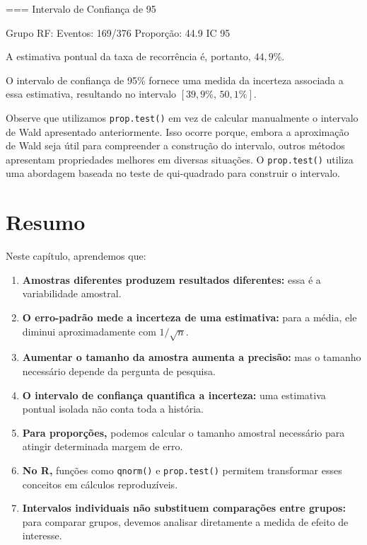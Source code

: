 \begin{code}[Resultado]
=== Intervalo de Confiança de 95%

Grupo RF:
  Eventos: 169/376
  Proporção: 44.9 %
  IC 95%
\end{code}

A estimativa pontual da taxa de recorrência é, portanto, $44{,}9\%$.

O intervalo de confiança de 95\% fornece uma medida da incerteza associada a essa estimativa, resultando no intervalo $[39{,}9\%,\,50{,}1\%]$.

Observe que utilizamos \texttt{prop.test()} em vez de calcular manualmente o intervalo de Wald apresentado anteriormente. Isso ocorre porque, embora a aproximação de Wald seja útil para compreender a construção do intervalo, outros métodos apresentam propriedades melhores em diversas situações. O \texttt{prop.test()} utiliza uma abordagem baseada no teste de qui-quadrado para construir o intervalo.

\section{Resumo}

Neste capítulo, aprendemos que:

\begin{enumerate}
    \item \textbf{Amostras diferentes produzem resultados diferentes:} essa é a variabilidade amostral.
    \item \textbf{O erro-padrão mede a incerteza de uma estimativa:} para a média, ele diminui aproximadamente com $1/\sqrt{n}$.
    \item \textbf{Aumentar o tamanho da amostra aumenta a precisão:} mas o tamanho necessário depende da pergunta de pesquisa.
    \item \textbf{O intervalo de confiança quantifica a incerteza:} uma estimativa pontual isolada não conta toda a história.
    \item \textbf{Para proporções,} podemos calcular o tamanho amostral necessário para atingir determinada margem de erro.
    \item \textbf{No R,} funções como \texttt{qnorm()} e \texttt{prop.test()} permitem transformar esses conceitos em cálculos reproduzíveis.
    \item \textbf{Intervalos individuais não substituem comparações entre grupos:} para comparar grupos, devemos analisar diretamente a medida de efeito de interesse.
\end{enumerate}